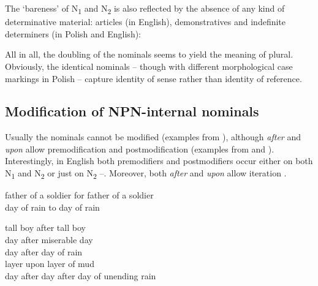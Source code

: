 \documentclass[output=paper]{langscibook}
\begin{document}
The ‘bareness’ of N\textsubscript{1} and N\textsubscript{2} is also reflected by the absence of any kind of determinative material: articles (in English), demonstratives and indefinite determiners (in Polish and English):

\ea\label{psk:ex:key:9}
\z
\z

\noindent All in all, the doubling of the nominals seems to yield the meaning of plural. Obviously, the identical nominals – though with different morphological case markings in Polish – capture identity of sense rather than identity of reference.

\subsection{Modification of NPN-internal nominals}\label{psk:sec:sec2-3}

Usually the nominals cannot be modified  (examples from \citealt{Jackendoff2008}), although \textit{after} and \textit{upon} allow premodification and postmodification  (examples from \citealt{Jackendoff2008} and \citealt{Haik2013}). Interestingly, in English both premodifiers and postmodifiers occur either on both N\textsubscript{1} and N\textsubscript{2}  or just on N\textsubscript{2} --. Moreover, both \textit{after} and \textit{upon} allow iteration .

\ea \label{psk:ex:key:10}  \ea * father of a soldier for father of a soldier\\
\ex   * day of rain to day of rain\\
\z\z

\ea \label{psk:ex:key:11}  \ea\label{psk:ex:key:11-a} tall boy after tall boy\\
\ex\label{psk:ex:key:11-b} day after miserable day\\
\ex\label{psk:ex:key:11-c}   day after day of rain\\
\ex   layer upon layer of mud\\
\ex\label{psk:ex:key:11-e}   day after day after day of unending rain\\
\z\z
\end{document}
